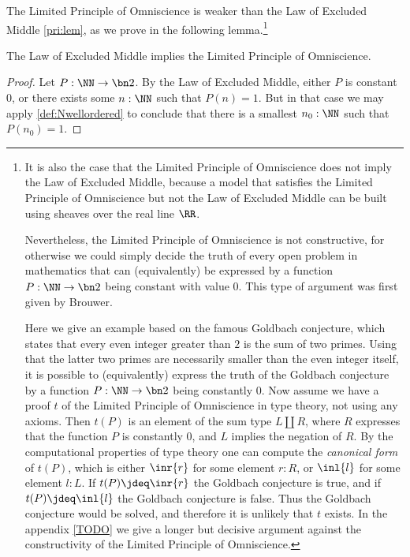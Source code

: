 The Limited Principle of Omniscience is weaker than the Law of Excluded Middle \cref{pri:lem}, as we prove in the following lemma.\footnote{%
  It is also the case that the Limited Principle of Omniscience does not imply the Law of Excluded Middle, because
  a model that satisfies the Limited Principle of Omniscience but not the Law of Excluded Middle can be built using sheaves over the real line $\RR$.

  Nevertheless, the Limited Principle of Omniscience is not constructive,
  for otherwise we could simply decide the truth of every open problem in mathematics
  that can (equivalently) be expressed by a function $P:\NN\to\bn 2$ being constant with value $0$.
  This type of argument was first given by Brouwer. %

  Here we give an example based on the famous Goldbach conjecture,
  which states that every even integer greater than $2$ is the sum of two primes. Using that
  the latter two primes are necessarily smaller than the even integer itself, it is possible
  to (equivalently) express the truth of the Goldbach conjecture by a function $P:\NN\to\bn 2$
  being constantly $0$. Now assume we have a proof $t$ of the Limited Principle of Omniscience
  in type theory, not using any axioms. Then $t(P)$ is an element of the
  sum type $L\amalg R$, where $R$ expresses that the function $P$ is constantly $0$,
  and $L$ implies the negation of $R$.
  By the computational properties of type theory one can compute the
  \emph{canonical form} of $t(P)$, which is either $\inr{r}$ for some element $r:R$,
  or $\inl{l}$ for some element $l:L$. If $t(P)\jdeq\inr{r}$ the Goldbach conjecture is true,
  and if $t(P)\jdeq\inl{l}$ the Goldbach conjecture is false. Thus the Goldbach conjecture
  would be solved, and therefore it is unlikely that $t$ exists.
  In the appendix \ref{TODO} we give a longer but decisive argument against the constructivity of
  the Limited Principle of Omniscience.
}


\begin{lemma}
  The Law of Excluded Middle implies the Limited Principle of Omniscience.
\end{lemma}

\begin{proof}
  Let $P:\NN\to\bn 2$. By the Law of Excluded Middle, either $P$ is constant $0$,
  or there exists some $n:\NN$ such that $P(n)=1$.
  But in that case we may apply \cref{def:Nwellordered}
  to conclude that there is a smallest $n_0:\NN$ such that $P(n_0)=1$.
\end{proof}

